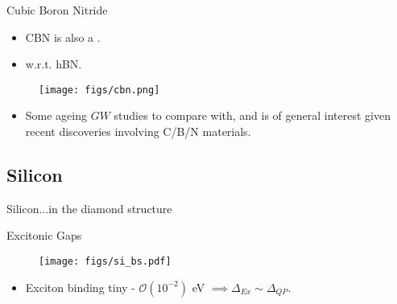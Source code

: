 \documentclass[12pt, pdf, hyperref={draft}, usenames, dvipsnames]{beamer}
\newcommand{\red}[1]{{\bf\color{LancsRed}{#1}}}
\newcommand{\green}[1]{{\bf\color{ForestGreen}{#1}}}
\begin{document}
\begin{frame}{Cubic Boron Nitride}
\begin{minipage}{0.4\textwidth}
\begin{itemize}
  \item CBN is also a \green{very good insulator}.
  \vspace{0.7cm}
  \item \red{Understudied} w.r.t. hBN.
\end{itemize}
\end{minipage}%
\begin{minipage}{0.6\textwidth}
  \begin{figure}[H]
    \centering
    \texttt{[image: figs/cbn.png]}
    \label{fig:cbn}
  \end{figure}
\end{minipage}

\begin{itemize}
  \item Some ageing $GW$ studies to compare with, and is of general interest
  given recent discoveries involving C/B/N materials.
\end{itemize}
\end{frame}

\subsection{Silicon} %

\begin{frame}{Silicon}{...in the diamond structure}
  \begin{block}{Excitonic Gaps}
    \begin{figure}[H]

    \centering
      \texttt{[image: figs/si\_bs.pdf]}

    \end{figure}
    \begin{itemize} %
      \item Exciton binding tiny - $\mathcal{O}(10^{-2})$ eV $ \implies
      \Delta_{Ex} \sim \Delta_{QP}$.
    \end{itemize}
  \end{block}
\end{frame}
\end{document}

